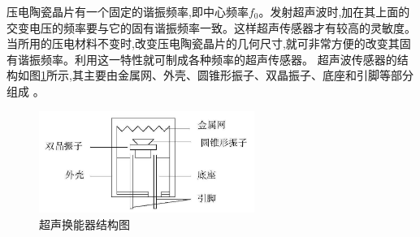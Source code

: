     压电陶瓷晶片有一个固定的谐振频率,即中心频率$f_0$。发射超声波时,加在其上面的交变电压的频率要与它的固有谐振频率一致。这样超声传感器才有较高的灵敏度。当所用的压电材料不变时,改变压电陶瓷晶片的几何尺寸,就可非常方便的改变其固有谐振频率。利用这一特性就可制成各种频率的超声传感器。
    超声波传感器的结构如图\ref{超声换能器结构图}所示,其主要由金属网、外壳、圆锥形振子、双晶振子、底座和引脚等部分组成 。
    \begin{figure}[!h]
    	\centering
    	\includegraphics[width=7cm]{figure/超声换能器结构图.png}
    	\caption{超声换能器结构图}
    	\label{超声换能器结构图}
    \end{figure}

